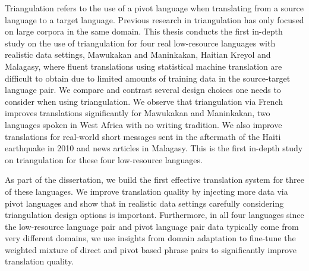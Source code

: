 
%
%


Triangulation refers to the use of a pivot language when translating from a source language to a target language. Previous research in triangulation has only focused on large corpora in the same domain.  This thesis conducts the first in-depth study on the use of triangulation for four real low-resource languages with realistic data settings, Mawukakan and Maninkakan, Haitian Kreyol and Malagasy, where fluent translations using statistical machine translation are difficult to obtain due to limited amounts of training data in the source-target language pair. We compare and contrast several design choices one needs to consider when using triangulation. We observe that triangulation via French improves translations significantly for Mawukakan and Maninkakan, two languages spoken in West Africa with no writing tradition. We also improve translations for real-world short messages sent in the aftermath of the Haiti earthquake in 2010 and news articles in Malagasy. This is the first in-depth study on triangulation for these four low-resource languages.

As part of the dissertation, we build the first effective translation system for three of these languages. We improve translation quality by injecting more data via pivot languages and show that in realistic data settings carefully considering triangulation design options is important. Furthermore, in all four languages since the low-resource language pair and pivot language pair data typically come from very different domains, we use insights from domain adaptation to fine-tune the weighted mixture of direct and pivot based phrase pairs to significantly improve translation quality. 





